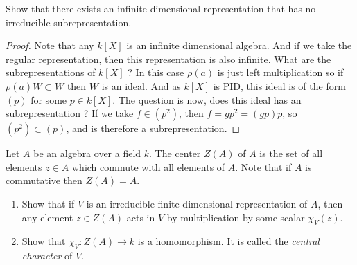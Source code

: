 \begin{thm}
Show that there exists an infinite dimensional representation that has no irreducible subrepresentation.
\end{thm}

\begin{proof}
Note that any $k[X]$ is an infinite dimensional algebra. And if we take the regular representation, then this representation is also infinite. What are the subrepresentations of $k[X]$ ? In this case $\rho(a)$ is just left multiplication so if $\rho(a)W \subset W$ then $W$ is an ideal. And as $k[X]$ is PID, this ideal is of the form $(p)$ for some $p \in k[X]$. The question is now, does this ideal has an subrepresentation ? If we take $f \in (p^2)$, then $f= gp^2= (gp)p$, so $(p^2)\subset (p)$, and is therefore a subrepresentation. 
\end{proof}

\begin{defn}
Let \(A\) be an algebra over a field \(k\). The center \(Z(A)\) of \(A\) is the set of all elements \(z\in A\) which commute with all elements of \(A\). Note that if \(A\) is commutative then \(Z(A)=A\).
\end{defn}


\begin{thm} 
\begin{enumerate}
  \item Show that if \(V\) is an irreducible finite dimensional representation of \(A\), then any element \(z\in Z(A)\) acts in \(V\) by multiplication by some scalar \(\chi _{V} (z)\).
  \item Show that \(\chi _{V} :Z(A)\rightarrow k\) is a homomorphism. It is called the \emph{central character} of \(V\).
\end{enumerate}

\end{thm}

